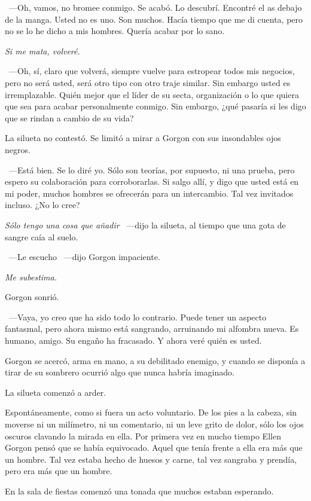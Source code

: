 ~---Oh, vamos, no bromee conmigo. Se acabó. Lo descubrí. Encontré el as debajo de la manga. Usted no es uno. Son muchos. Hacía tiempo que me di cuenta, pero no se lo he dicho a mis hombres. Quería acabar por lo sano.

\emph{Si me mata, volveré.}

~---Oh, sí, claro que volverá, siempre vuelve para estropear todos mis negocios, pero no será usted, será otro tipo con otro traje similar. Sin embargo usted es irremplazable. Quién mejor que el líder de su secta, organización o lo que quiera que sea para acabar personalmente conmigo. Sin embargo, ¿qué pasaría si les digo que se rindan a cambio de su vida?

La silueta no contestó. Se limitó a mirar a Gorgon con sus insondables ojos negros.

~---Está bien. Se lo diré yo. Sólo son teorías, por supuesto, ni una prueba, pero espero su colaboración para corroborarlas. Si salgo allí, y digo que usted está en mi poder, muchos hombres se ofrecerán para un intercambio. Tal vez invitados incluso. ¿No lo cree?

\emph{Sólo tengo una cosa que añadir} ~---dijo la silueta, al tiempo que una gota de sangre caía al suelo.

~---Le escucho ~---dijo Gorgon impaciente.

\emph{Me subestima.}

Gorgon sonrió.

~---Vaya, yo creo que ha sido todo lo contrario. Puede tener un aspecto fantasmal, pero ahora mismo está sangrando, arruinando mi alfombra nueva. Es humano, amigo. Su engaño ha fracasado. Y ahora veré quién es usted.

Gorgon se acercó, arma en mano, a su debilitado enemigo, y cuando se disponía a tirar de su sombrero ocurrió algo que nunca habría imaginado.

La silueta comenzó a arder.

Espontáneamente, como si fuera un acto voluntario. De los pies a la cabeza, sin moverse ni un milímetro, ni un comentario, ni un leve grito de dolor, sólo los ojos oscuros clavando la mirada en ella. Por primera vez en mucho tiempo Ellen Gorgon pensó que se había equivocado. Aquel que tenía frente a ella era más que un hombre. Tal vez estaba hecho de huesos y carne, tal vez sangraba y prendía, pero era más que un hombre.

\bigskip\noindent
En la sala de fiestas comenzó una tonada que muchos estaban esperando.

